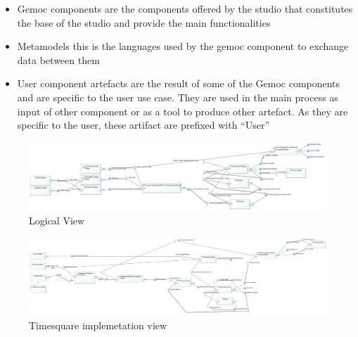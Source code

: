\documentclass{gemoc} %
\begin{document}
\begin{itemize}
	\item Gemoc components are the components offered by the studio that constitutes the base of the studio and provide the main functionalities
	\item Metamodels this is the languages used by the gemoc component to exchange data between them
	\item User component artefacts are the result of some of the Gemoc components and are specific to the user use case. They are used in the main process as input of other component or as a tool to produce other artefact. As they are specific to the user, these artifact are prefixed with “User”
\end{itemize}

\begin{figure}[bt]
	\begin{center}
	\includegraphics*[trim=0.0cm 0.0cm 0cm 0.0cm, clip=true, angle=90, totalheight=0.9\textheight]{../images/Logical View.jpg}
	\caption{Logical View}
	\label{fig:LogicalView}
	\end{center}
\end{figure}
\begin{figure}[bt]
	\begin{center}
	\includegraphics*[trim=0.0cm 0.0cm 0cm 0.0cm, clip=true, angle=90, totalheight=0.9\textheight]{../images/TimesquareImplementation.jpg}
	\caption{Timesquare implemetation view}
	\label{fig:TimesquareImplementation}
	\end{center}
\end{figure}
\end{document}
